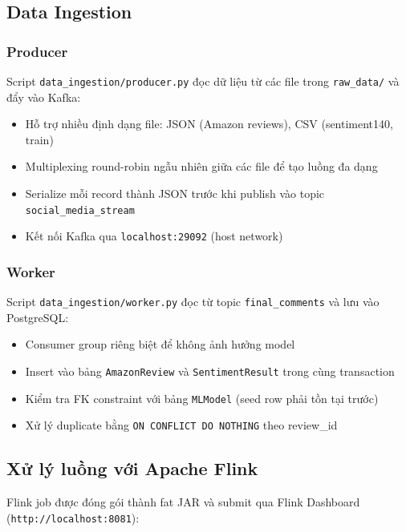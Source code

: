\subsection{Data Ingestion}

\subsubsection{Producer}

Script \texttt{data\_ingestion/producer.py} đọc dữ liệu từ các file trong \texttt{raw\_data/} và đẩy vào Kafka:
\begin{itemize}
    \item Hỗ trợ nhiều định dạng file: JSON (Amazon reviews), CSV (sentiment140, train)
    \item Multiplexing round-robin ngẫu nhiên giữa các file để tạo luồng đa dạng
    \item Serialize mỗi record thành JSON trước khi publish vào topic \texttt{social\_media\_stream}
    \item Kết nối Kafka qua \texttt{localhost:29092} (host network)
\end{itemize}

\subsubsection{Worker}

Script \texttt{data\_ingestion/worker.py} đọc từ topic \texttt{final\_comments} và lưu vào PostgreSQL:
\begin{itemize}
    \item Consumer group riêng biệt để không ảnh hưởng model
    \item Insert vào bảng \texttt{AmazonReview} và \texttt{SentimentResult} trong cùng transaction
    \item Kiểm tra FK constraint với bảng \texttt{MLModel} (seed row phải tồn tại trước)
    \item Xử lý duplicate bằng \texttt{ON CONFLICT DO NOTHING} theo review\_id
\end{itemize}

\subsection{Xử lý luồng với Apache Flink}

Flink job được đóng gói thành fat JAR và submit qua Flink Dashboard (\texttt{http://localhost:8081}):

